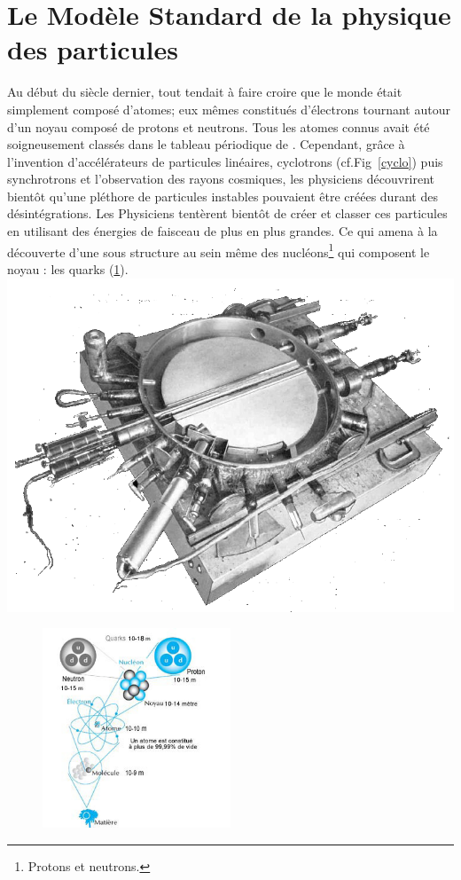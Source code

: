 \section{Le Modèle Standard de la physique des particules}
 
Au début du siècle dernier, tout tendait à faire croire que le monde était simplement composé d'atomes; eux mêmes constitués d'électrons tournant autour d'un noyau composé de protons et neutrons. Tous les atomes connus avait été soigneusement classés dans le tableau périodique de . Cependant, grâce à l'invention d'accélérateurs de particules linéaires, cyclotrons (cf.Fig~\ref{cyclo}) puis synchrotrons et l'observation des rayons cosmiques, les physiciens découvrirent bientôt qu'une pléthore de particules instables pouvaient être créées durant des désintégrations. Les Physiciens tentèrent bientôt de créer et classer ces particules en utilisant des énergies de faisceau de plus en plus grandes. Ce qui amena à la découverte d'une sous structure au sein même des nucléons\footnote{Protons et neutrons.} qui composent le noyau : les quarks (\ref{structure}).
\marginpar
{
	\includegraphics[width=\marginparwidth]{SM/cyclotron.png}
    \label{cyclo}
}

\vspace*{-0.5cm}
\begin{figure}[ht!]
\centering
\includegraphics[width=0.50\textwidth]{SM/structure.jpg}
\label{structure}
\end{figure}

